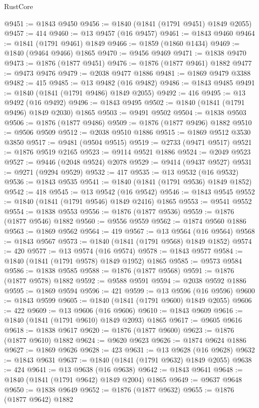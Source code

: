 \begin{lexlean}{RustCore}
\begin{coremodule}
@9451 := @1843 @9450
@9456 := @1840 (@1841 (@1791 @9451) @1849 @2055)
@9457 := 414
@9460 := @13 @9457 (@16 @9457)
@9461 := @1843 @9460
@9464 := @1841 (@1791 @9461) @1849
@9466 := @1859 (@1860 @1434)
@9469 := @1840 (@9464 @9466) @1865
@9470 := @9456 @9469
@9471 := @1838 @9470
@9473 := @1876 (@1877 @9451)
@9476 := @1876 (@1877 @9461) @1882
@9477 := @9473 @9476
@9479 := @2038 @9477 @1886
@9481 := @1869 @9479 @3388
@9482 := 415
@9485 := @13 @9482 (@16 @9482)
@9486 := @1843 @9485
@9491 := @1840 (@1841 (@1791 @9486) @1849 @2055)
@9492 := 416
@9495 := @13 @9492 (@16 @9492)
@9496 := @1843 @9495
@9502 := @1840 (@1841 (@1791 @9496) @1849 @2030) @1865
@9503 := @9491 @9502
@9504 := @1838 @9503
@9506 := @1876 (@1877 @9486)
@9509 := @1876 (@1877 @9496) @1882
@9510 := @9506 @9509
@9512 := @2038 @9510 @1886
@9515 := @1869 @9512 @3530 @3850
@9517 := @9481 (@9504 @9515)
@9519 := @2733 (@9471 @9517)
@9521 := @1876 @9519 @2165
@9523 := @9114 @9521 @1886
@9524 := @2049 @9523
@9527 := @9446 (@2048 @9524) @2078
@9529 := @9414 (@9437 @9527)
@9531 := @9271 (@9294 @9529)
@9532 := 417
@9535 := @13 @9532 (@16 @9532)
@9536 := @1843 @9535
@9541 := @1840 (@1841 (@1791 @9536) @1849 @1852)
@9542 := 418
@9545 := @13 @9542 (@16 @9542)
@9546 := @1843 @9545
@9552 := @1840 (@1841 (@1791 @9546) @1849 @2416) @1865
@9553 := @9541 @9552
@9554 := @1838 @9553
@9556 := @1876 (@1877 @9536)
@9559 := @1876 (@1877 @9546) @1882
@9560 := @9556 @9559
@9562 := @1874 @9560 @1886
@9563 := @1869 @9562
@9564 := 419
@9567 := @13 @9564 (@16 @9564)
@9568 := @1843 @9567
@9573 := @1840 (@1841 (@1791 @9568) @1849 @1852)
@9574 := 420
@9577 := @13 @9574 (@16 @9574)
@9578 := @1843 @9577
@9584 := @1840 (@1841 (@1791 @9578) @1849 @1952) @1865
@9585 := @9573 @9584
@9586 := @1838 @9585
@9588 := @1876 (@1877 @9568)
@9591 := @1876 (@1877 @9578) @1882
@9592 := @9588 @9591
@9594 := @2038 @9592 @1886
@9595 := @1869 @9594
@9596 := 421
@9599 := @13 @9596 (@16 @9596)
@9600 := @1843 @9599
@9605 := @1840 (@1841 (@1791 @9600) @1849 @2055)
@9606 := 422
@9609 := @13 @9606 (@16 @9606)
@9610 := @1843 @9609
@9616 := @1840 (@1841 (@1791 @9610) @1849 @2093) @1865
@9617 := @9605 @9616
@9618 := @1838 @9617
@9620 := @1876 (@1877 @9600)
@9623 := @1876 (@1877 @9610) @1882
@9624 := @9620 @9623
@9626 := @1874 @9624 @1886
@9627 := @1869 @9626
@9628 := 423
@9631 := @13 @9628 (@16 @9628)
@9632 := @1843 @9631
@9637 := @1840 (@1841 (@1791 @9632) @1849 @2055)
@9638 := 424
@9641 := @13 @9638 (@16 @9638)
@9642 := @1843 @9641
@9648 := @1840 (@1841 (@1791 @9642) @1849 @2004) @1865
@9649 := @9637 @9648
@9650 := @1838 @9649
@9652 := @1876 (@1877 @9632)
@9655 := @1876 (@1877 @9642) @1882

\end{coremodule}
\end{lexlean}
